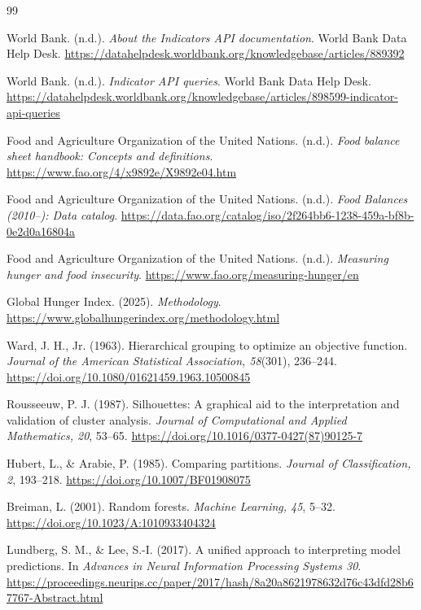 \documentclass[11pt]{article}
\begin{document}
\clearpage
\begin{thebibliography}{99}
\small

World Bank. (n.d.). \textit{About the Indicators API documentation}. World Bank Data Help Desk. \url{https://datahelpdesk.worldbank.org/knowledgebase/articles/889392}

World Bank. (n.d.). \textit{Indicator API queries}. World Bank Data Help Desk. \url{https://datahelpdesk.worldbank.org/knowledgebase/articles/898599-indicator-api-queries}

Food and Agriculture Organization of the United Nations. (n.d.). \textit{Food balance sheet handbook: Concepts and definitions}. \url{https://www.fao.org/4/x9892e/X9892e04.htm}

Food and Agriculture Organization of the United Nations. (n.d.). \textit{Food Balances (2010--): Data catalog}. \url{https://data.fao.org/catalog/iso/2f264bb6-1238-459a-bf8b-0e2d0a16804a}

Food and Agriculture Organization of the United Nations. (n.d.). \textit{Measuring hunger and food insecurity}. \url{https://www.fao.org/measuring-hunger/en}

Global Hunger Index. (2025). \textit{Methodology}. \url{https://www.globalhungerindex.org/methodology.html}

Ward, J. H., Jr. (1963). Hierarchical grouping to optimize an objective function. \textit{Journal of the American Statistical Association, 58}(301), 236--244. \url{https://doi.org/10.1080/01621459.1963.10500845}

Rousseeuw, P. J. (1987). Silhouettes: A graphical aid to the interpretation and validation of cluster analysis. \textit{Journal of Computational and Applied Mathematics, 20}, 53--65. \url{https://doi.org/10.1016/0377-0427(87)90125-7}

Hubert, L., \& Arabie, P. (1985). Comparing partitions. \textit{Journal of Classification, 2}, 193--218. \url{https://doi.org/10.1007/BF01908075}

Breiman, L. (2001). Random forests. \textit{Machine Learning, 45}, 5--32. \url{https://doi.org/10.1023/A:1010933404324}

Lundberg, S. M., \& Lee, S.-I. (2017). A unified approach to interpreting model predictions. In \textit{Advances in Neural Information Processing Systems 30}. \url{https://proceedings.neurips.cc/paper/2017/hash/8a20a8621978632d76c43dfd28b67767-Abstract.html}

\end{thebibliography}
\end{document}

